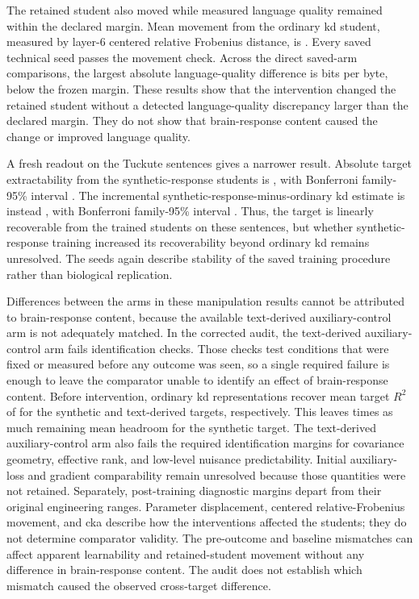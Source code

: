 The retained student also moved while measured language quality remained within the declared margin.
Mean movement from the ordinary \ac{kd} student, measured by layer-6 centered relative Frobenius distance, is .
Every saved technical seed passes the movement check.
Across the direct saved-arm comparisons, the largest absolute language-quality difference is  bits per byte, below the frozen  margin.
These results show that the intervention changed the retained student without a detected language-quality discrepancy larger than the declared margin.
They do not show that brain-response content caused the change or improved language quality. 

A fresh readout on the Tuckute sentences gives a narrower result.
Absolute target extractability from the synthetic-response students is , with Bonferroni family-95\% interval .
The incremental synthetic-response-minus-ordinary \ac{kd} estimate is instead , with Bonferroni family-95\% interval .
Thus, the target is linearly recoverable from the trained students on these sentences, but whether synthetic-response training increased its recoverability beyond ordinary \ac{kd} remains unresolved.
The  seeds again describe stability of the saved training procedure rather than biological replication. 

Differences between the arms in these manipulation results cannot be attributed to brain-response content, because the available text-derived auxiliary-control arm is not adequately matched.
In the corrected audit, the text-derived auxiliary-control arm fails  identification checks.
Those checks test conditions that were fixed or measured before any outcome was seen, so a single required failure is enough to leave the comparator unable to identify an effect of brain-response content.
Before intervention, ordinary \ac{kd} representations recover mean target \(R^2\) of  for the synthetic and text-derived targets, respectively.
This leaves  times as much remaining mean headroom for the synthetic target.
The text-derived auxiliary-control arm also fails the required identification margins for covariance geometry, effective rank, and low-level nuisance predictability.
Initial auxiliary-loss and gradient comparability remain unresolved because those quantities were not retained.
Separately,  post-training diagnostic margins depart from their original engineering ranges.
Parameter displacement, centered relative-Frobenius movement, and \ac{cka} describe how the interventions affected the students; they do not determine comparator validity.
The pre-outcome and baseline mismatches can affect apparent learnability and retained-student movement without any difference in brain-response content.
The audit does not establish which mismatch caused the observed cross-target difference. 

